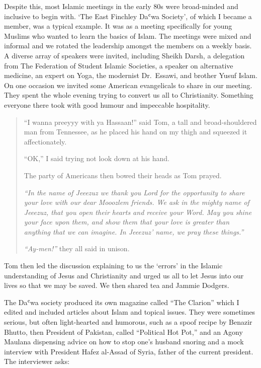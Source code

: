 \documentclass[12pt]{memoir}
\def\`{ʿ} %
\newcommand{\cor}[2]{#2} %
\def\–{-\hskip0pt}
\begin{document}
Despite this, most Islamic meetings in the early 80s
were broad-minded and inclusive to begin with.
‘The East Finchley Da\`wa Society’, of which I became a member,
was a typical example.
It was as a meeting specifically for young Muslims
who wanted to learn the basics of Islam.
The meetings were mixed and informal
and we rotated the leadership amongst the members on a weekly basis.
A diverse array of speakers were invited, including Sheikh Darsh,
a delegation from The Federation of Student Islamic Societies,
a speaker on alternative medicine, an expert on Yoga,
the modernist Dr.\ Essawi, and brother Yusuf Islam.
On one occasion we invited some American evangelicals to share in our meeting.
They spent the whole evening trying to convert us all to Christianity.
Something everyone there took with good humour and impeccable hospitality.

\begin{quote}
“I wanna preeyyy with ya Hassaan!” said Tom,
a tall and broad\–shouldered man from Tennessee,
as he placed his hand on my thigh and squeezed it affectionately.

“OK,” I said trying not look down at his hand.

The party of Americans then bowed their heads as Tom prayed.

\emph{“In the name of Jeeezuz we thank you Lord
for the opportunity to share your love with our dear Mooozlem friends.
We ask in the mighty name of Jeeezuz,
that you open their hearts and receive your Word.
May you shine your face upon them,
and show them that your love is greater than anything that we can imagine.
In Jeeezuz’ name, we pray these things.”}

\emph{“Ay-men!”} they all said in unison.
\end{quote}

Tom then led the discussion explaining to us the ‘errors’
in the Islamic understanding of Jesus and Christianity
and urged us all to let Jesus into our lives so that we may be saved.
We then shared tea and Jammie Dodgers.

The Da\`wa society produced its own magazine called “The Clarion”
which I edited and included articles about Islam and topical issues.
They were sometimes serious, but often light\–hearted and humorous,
such as a spoof recipe by Benazir Bhutto,
then President of Pakistan, called “Political Hot Pot,”
and an Agony Maulana dispensing advice on how to stop one’s husband snoring
and a mock interview with President
\cor{Hafiz al-Asad}{Hafez al-Assad} of Syria,
father of the current president.
The interviewer asks:
\end{document}
